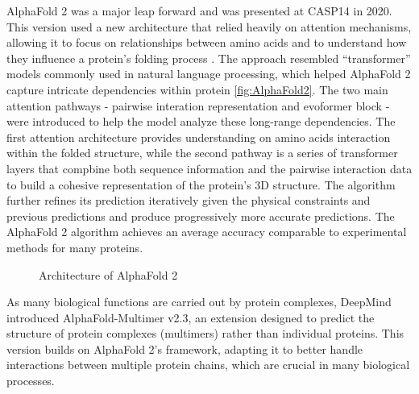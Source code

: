\documentclass[a4paper]{article}
\begin{document}
AlphaFold 2 was a major leap forward and was presented at CASP14 in 2020. This version used a new architecture that relied heavily on attention mechanisms, allowing it to focus on relationships between amino acids and to understand how they influence a protein’s folding process \cite{jumper_highly_2021}. The approach resembled “transformer” models commonly used in natural language processing, which helped AlphaFold 2 capture intricate dependencies within protein \autoref{fig:AlphaFold2}. The two main attention pathways - pairwise interation representation and evoformer block - were introduced to help the model analyze these long-range dependencies. The first attention architecture provides understanding on amino acids interaction within the folded structure, while the second pathway is a series of transformer layers that compbine both sequence information and the pairwise interaction data to build a cohesive representation of the protein's 3D structure. The algorithm further refines its prediction iteratively given the physical constraints and previous predictions and produce progressively more accurate predictions. The AlphaFold 2 algorithm achieves an average accuracy comparable to experimental methods for many proteins.

\begin{figure}[h]
    \caption{Architecture of AlphaFold 2} 
    \label{fig:AlphaFold2}
\end{figure}


As many biological functions are carried out by protein complexes, DeepMind introduced AlphaFold-Multimer v2.3, an extension designed to predict the structure of protein complexes (multimers) rather than individual proteins. This version builds on AlphaFold 2’s framework, adapting it to better handle interactions between multiple protein chains, which are crucial in many biological processes.
\end{document}
